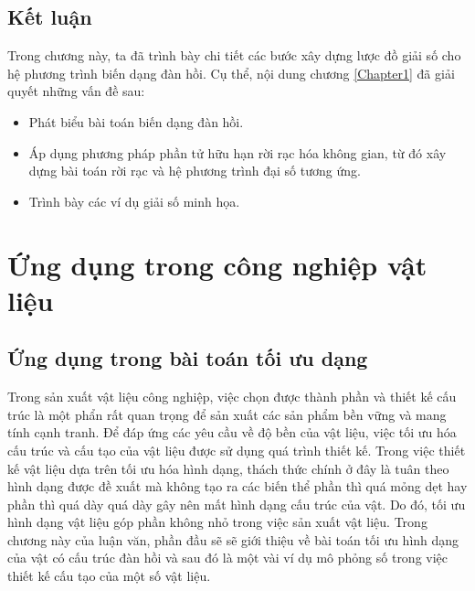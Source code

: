 \documentclass[
12pt, %
oneside, %
english, %
onehalfspacing, %
nolistspacing, %
headsepline, %
addchap,
]{MastersDoctoralThesis} %
\renewcommand{\baselinestretch}{1.5}
\begin{document}
\section{Kết luận}
Trong chương này, ta đã trình bày chi tiết các bước xây dựng lược đồ giải số cho hệ phương trình biến dạng đàn hồi. Cụ thể, nội dung chương \ref{Chapter1} đã giải quyết những vấn đề sau:
\begin{itemize}
\item Phát biểu bài toán biến dạng đàn hồi.
\item Áp dụng phương pháp phần tử hữu hạn rời rạc hóa không gian, từ đó xây dựng bài toán rời rạc và hệ phương trình đại số tương ứng.
\item Trình bày các ví dụ giải số minh họa.
\end{itemize}

\chapter{Ứng dụng trong công nghiệp vật liệu}\label{Chapter2}
\renewcommand{\baselinestretch}{1.25}
\minitoc
\renewcommand{\baselinestretch}{1.5}
\section{Ứng dụng trong bài toán tối ưu dạng}
Trong sản xuất vật liệu công nghiệp, việc chọn được thành phần và thiết kế cấu trúc là một phẩn rất quan trọng để sản xuất các sản phẩm bền vững và mang tính cạnh tranh. Để đáp ứng các yêu cầu về độ bền của vật liệu, việc tối ưu hóa cấu trúc và cấu tạo của vật liệu được sử dụng quá trình thiết kế. Trong việc thiết kế vật liệu dựa trên tối ưu hóa hình dạng, thách thức chính ở đây là tuân theo hình dạng được đề xuất mà không tạo ra các biến thể phần thì quá mỏng dẹt hay phần thì quá dày quá dày gây nên mất hình dạng cấu trúc của vật. Do đó, tối ưu hình dạng vật liệu góp phần không nhỏ trong việc sản xuất vật liệu. Trong chương này của luận văn, phần đầu sẽ sẽ giới thiệu về bài toán tối ưu hình dạng của vật có cấu trúc đàn hồi và sau đó là một vài ví dụ mô phỏng số trong việc thiết kế cấu tạo của một số vật liệu.
\end{document}
